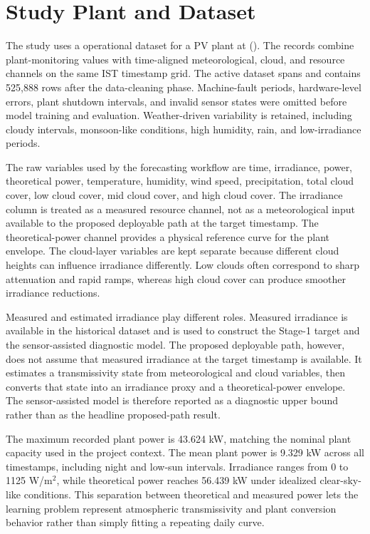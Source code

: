 \section{Study Plant and Dataset}
\label{sec:dataset}

The study uses a \Cadence{} operational dataset for a \PlantCapacity{} PV plant at \StudySite{} (\StudyCoords). The records combine plant-monitoring values with time-aligned meteorological, cloud, and resource channels on the same IST timestamp grid. The active dataset spans \DataSpan{} and contains 525,888 rows after the data-cleaning phase. Machine-fault periods, hardware-level errors, plant shutdown intervals, and invalid sensor states were omitted before model training and evaluation. Weather-driven variability is retained, including cloudy intervals, monsoon-like conditions, high humidity, rain, and low-irradiance periods.



The raw variables used by the forecasting workflow are time, irradiance, power, theoretical power, temperature, humidity, wind speed, precipitation, total cloud cover, low cloud cover, mid cloud cover, and high cloud cover. The irradiance column is treated as a measured resource channel, not as a meteorological input available to the proposed deployable path at the target timestamp. The theoretical-power channel provides a physical reference curve for the plant envelope. The cloud-layer variables are kept separate because different cloud heights can influence irradiance differently. Low clouds often correspond to sharp attenuation and rapid ramps, whereas high cloud cover can produce smoother irradiance reductions.



Measured and estimated irradiance play different roles. Measured irradiance is available in the historical dataset and is used to construct the Stage-1 target and the sensor-assisted diagnostic model. The proposed deployable path, however, does not assume that measured irradiance at the target timestamp is available. It estimates a transmissivity state from meteorological and cloud variables, then converts that state into an irradiance proxy and a theoretical-power envelope. The sensor-assisted model is therefore reported as a diagnostic upper bound rather than as the headline proposed-path result.

The maximum recorded plant power is 43.624 kW, matching the nominal plant capacity used in the project context. The mean plant power is 9.329 kW across all timestamps, including night and low-sun intervals. Irradiance ranges from 0 to 1125 W/m$^2$, while theoretical power reaches 56.439 kW under idealized clear-sky-like conditions. This separation between theoretical and measured power lets the learning problem represent atmospheric transmissivity and plant conversion behavior rather than simply fitting a repeating daily curve.

